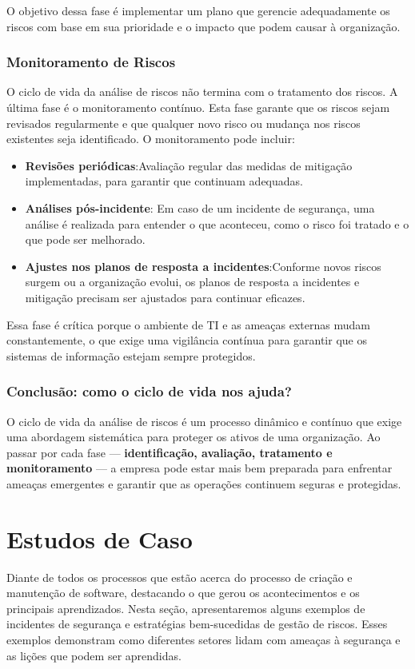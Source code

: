 \documentclass[12pt,oneside,a4paper,article]{abntex2}
\begin{document}
{O objetivo dessa fase é implementar um plano que gerencie adequadamente os riscos com base em sua prioridade e o impacto que podem causar à organização.}

\subsubsection{Monitoramento de Riscos}
{O ciclo de vida da análise de riscos não termina com o tratamento dos riscos. A última fase é o monitoramento contínuo. Esta fase garante que os riscos sejam revisados regularmente e que qualquer novo risco ou mudança nos riscos existentes seja identificado. O monitoramento pode incluir:}

\begin{itemize}
\item \textbf{Revisões periódicas}:Avaliação regular das medidas de mitigação implementadas, para garantir que continuam adequadas.
    \item \textbf{Análises pós-incidente}: Em caso de um incidente de segurança, uma análise é realizada para entender o que aconteceu, como o risco foi tratado e o que pode ser melhorado.
    \item \textbf{Ajustes nos planos de resposta a incidentes}:Conforme novos riscos surgem ou a organização evolui, os planos de resposta a incidentes e mitigação precisam ser ajustados para continuar eficazes.
\end{itemize}

{Essa fase é crítica porque o ambiente de TI e as ameaças externas mudam constantemente, o que exige uma vigilância contínua para garantir que os sistemas de informação estejam sempre protegidos.}

\subsubsection{Conclusão: como o ciclo de vida nos ajuda?}
{O ciclo de vida da análise de riscos é um processo dinâmico e contínuo que exige uma abordagem sistemática para proteger os ativos de uma organização. Ao passar por cada fase — \textbf{identificação, avaliação, tratamento e monitoramento} — a empresa pode estar mais bem preparada para enfrentar ameaças emergentes e garantir que as operações continuem seguras e protegidas.}



\section{Estudos de Caso}
{Diante de todos os processos que estão acerca do processo de criação e manutenção de software, destacando o que gerou os acontecimentos e os principais aprendizados. Nesta seção, apresentaremos alguns exemplos de incidentes de segurança e estratégias bem-sucedidas de gestão de riscos. Esses exemplos demonstram como diferentes setores lidam com ameaças à segurança e as lições que podem ser aprendidas.}
\end{document}
